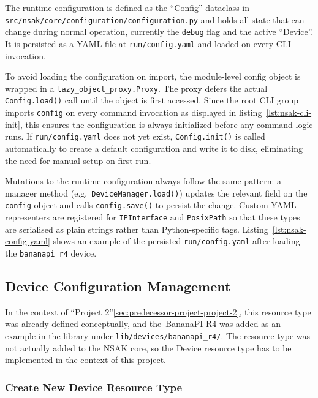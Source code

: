 The runtime configuration is defined as the \enquote{Config} dataclass in \texttt{src/nsak/core/configuration/configuration.py} and holds all state that can change during normal operation, currently the \texttt{debug} flag and the active \enquote{Device}.
It is persisted as a \gls{YAML} file at \texttt{run/config.yaml} and loaded on every \gls{CLI} invocation.

To avoid loading the configuration on import, the module-level config object is wrapped in a \texttt{lazy_object_proxy.Proxy}.
The proxy defers the actual \texttt{Config.load()} call until the object is first accessed.
Since the root \gls{CLI} group imports \texttt{config} on every command invocation as displayed in listing~\ref{lst:nsak-cli-init}, this ensures the configuration is always initialized before any command logic runs.
If \texttt{run/config.yaml} does not yet exist, \texttt{Config.init()} is called automatically to create a default configuration and write it to disk, eliminating the need for manual setup on first run.


Mutations to the runtime configuration always follow the same pattern: a manager method (e.g.~\texttt{DeviceManager.load()}) updates the relevant field on the \texttt{config} object and calls \texttt{config.save()} to persist the change.
Custom \gls{YAML} representers are registered for \texttt{IPInterface} and \texttt{PosixPath} so that these types are serialised as plain strings rather than Python-specific tags.
Listing~\ref{lst:nsak-config-yaml} shows an example of the persisted \texttt{run/config.yaml} after loading the \texttt{bananapi_r4} device.


\subsection{Device Configuration Management}\label{subsec:device-configuration-management}

In the context of \enquote{Project 2}\ref{sec:predecessor-project-project-2}, this resource type was already defined conceptually,
and the~\gls{BananaPI R4} was added as an example in the library under \texttt{lib/devices/bananapi_r4/}.
The resource type was not actually added to the \gls{NSAK} core,
so the Device resource type has to be implemented in the context of this project.

\subsubsection{Create New Device Resource Type}\label{subsubsec:create-new-device-resource-type}

